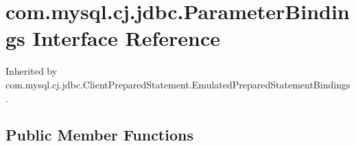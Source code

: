 \hypertarget{interfacecom_1_1mysql_1_1cj_1_1jdbc_1_1_parameter_bindings}{}\section{com.\+mysql.\+cj.\+jdbc.\+Parameter\+Bindings Interface Reference}
\label{interfacecom_1_1mysql_1_1cj_1_1jdbc_1_1_parameter_bindings}


Inherited by com.\+mysql.\+cj.\+jdbc.\+Client\+Prepared\+Statement.\+Emulated\+Prepared\+Statement\+Bindings.

\subsection*{Public Member Functions}
